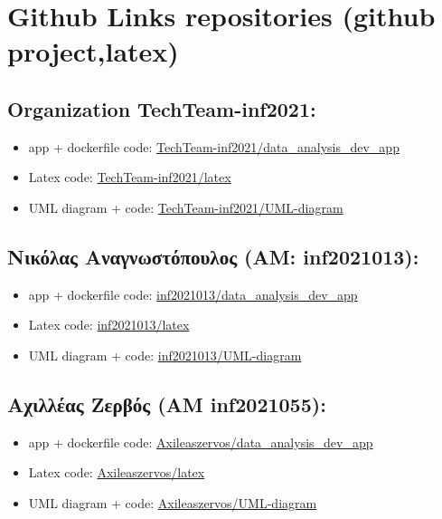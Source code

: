 \documentclass[a4paper,12pt]{article}
\begin{document}
\newpage




\section{Github Links repositories (github project,latex)}

\subsection{Organization TechTeam-inf2021:}
\begin{itemize}
    \item app + dockerfile code: \href{https://github.com/TechTeam-inf2021/data_analysis_dev_app}{TechTeam-inf2021/data\_analysis\_dev\_app}
    \item Latex code:
    \href{https://github.com/TechTeam-inf2021/Anafora_latex}{TechTeam-inf2021/latex}
    \item UML diagram + code:
    \href{https://github.com/TechTeam-inf2021/UML-diagram}{TechTeam-inf2021/UML-diagram}
\end{itemize}
\subsection{Νικόλας Αναγνωστόπουλος (ΑΜ: inf2021013):}
\begin{itemize}
    \item app + dockerfile code: \href{https://github.com/inf2021013/data_analysis_dev_app}{inf2021013/data\_analysis\_dev\_app}
    \item Latex code:
    \href{https://github.com/inf2021013/Anafora_latex}{inf2021013/latex}
    \item UML diagram + code:
    \href{https://github.com/inf2021013/UML-diagram}{inf2021013/UML-diagram}
\end{itemize}
\subsection{Αχιλλέας Ζερβός (ΑΜ inf2021055):}
\begin{itemize}
    \item app + dockerfile code: \href{https://github.com/Axileaszervos/data_analysis_dev_app}{Axileaszervos/data\_analysis\_dev\_app}
    \item Latex code:
    \href{https://github.com/Axileaszervos/Anafora_latex}{Axileaszervos/latex}
    \item UML diagram + code:
    \href{https://github.com/Axileaszervos/UML-diagram}{Axileaszervos/UML-diagram}
\end{itemize}
\end{document}
